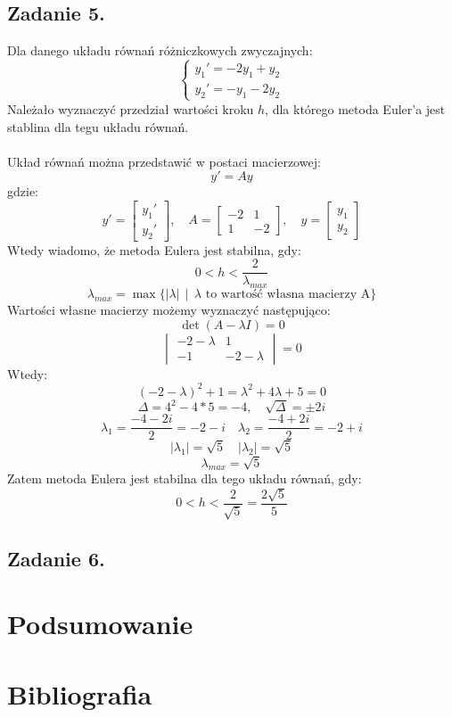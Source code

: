 \documentclass{article}
\begin{document}
\subsection{Zadanie 5.}
Dla danego układu równań różniczkowych zwyczajnych:
\begin{equation}
    \begin{cases}
        y_1' = -2y_1 + y_2 \\
        y_2' = -y_1 - 2y_2
    \end{cases} \nonumber
\end{equation}
Należało wyznaczyć przedział wartości kroku $h$, dla którego metoda Euler'a jest stablina dla tegu układu równań.
\\\\
Układ równań można przedstawić w postaci macierzowej:
$$ y' = Ay$$
gdzie:
\begin{equation}
    y' =
    \begin{bmatrix}
        y_1' \\ y_2'
    \end{bmatrix}
    ,\quad
    A =
    \begin{bmatrix}
        -2 & 1 \\
        1 & -2
    \end{bmatrix}
    ,\quad
    y =
    \begin{bmatrix}
        y_1 \\ y_2
    \end{bmatrix}
\nonumber
\end{equation}
Wtedy wiadomo, że metoda Eulera jest stabilna, gdy:
$$ 0 < h < \frac{2}{\lambda_{max}} $$
$$ \lambda_{max} = \max \{|\lambda|\ \ |\ \ \lambda\text{ to wartość własna macierzy A}\}$$
Wartości własne macierzy możemy wyznaczyć następująco:
$$ \det(A-\lambda I) = 0 $$
\begin{equation}
    \begin{vmatrix}
        -2-\lambda & 1 \\
        -1 & -2-\lambda
    \end{vmatrix}
    = 0
\nonumber
\end{equation}
Wtedy:
$$ (-2-\lambda)^2 + 1 = \lambda^2 + 4\lambda + 5 = 0 $$
$$ \Delta = 4^2 - 4*5 = -4, \quad \sqrt{\Delta} = \pm2i $$
$$ \lambda_1 = \frac{-4-2i}{2} = -2-i \quad \lambda_2 = \frac{-4+2i}{2} = -2+i $$
$$ |\lambda_1| = \sqrt{5} \quad |\lambda_2| = \sqrt{5} $$
$$ \lambda_{max} = \sqrt{5}$$
Zatem metoda Eulera jest stabilna dla tego układu równań, gdy:
$$ 0 < h < \frac{2}{\sqrt{5}} = \frac{2\sqrt{5}}{5}$$

\subsection{Zadanie 6.}

\section{Podsumowanie}

\section{Bibliografia}
\end{document}
